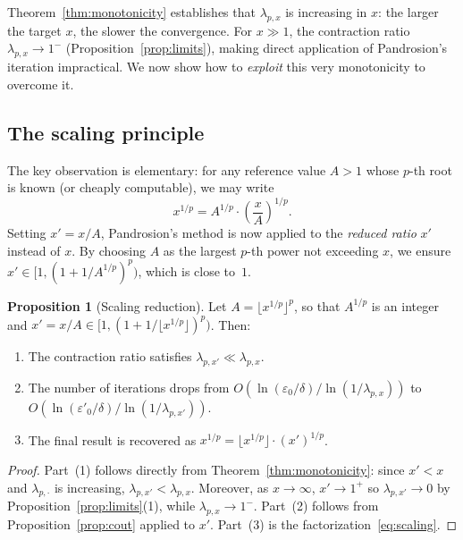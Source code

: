 \documentclass[11pt,a4paper]{article}
\theoremstyle{definition}
\newtheorem{proposition}{Proposition}[section]
\newcommand{\eps}{\varepsilon}
\begin{document}
Theorem~\ref{thm:monotonicity} establishes that $\lambda_{p,x}$ is increasing in $x$: the larger the target $x$, the slower the convergence. For $x \gg 1$, the contraction ratio $\lambda_{p,x} \to 1^-$ (Proposition~\ref{prop:limits}), making direct application of Pandrosion's iteration impractical. We now show how to \emph{exploit} this very monotonicity to overcome it.

\subsection{The scaling principle}

The key observation is elementary: for any reference value $A > 1$ whose $p$-th root is known (or cheaply computable), we may write
\begin{equation}
  \label{eq:scaling}
  x^{1/p} = A^{1/p} \cdot \left(\frac{x}{A}\right)^{\!1/p}.
\end{equation}
Setting $x' = x/A$, Pandrosion's method is now applied to the \emph{reduced ratio} $x'$ instead of $x$. By choosing $A$ as the largest $p$-th power not exceeding $x$, we ensure $x' \in [1, (1+1/A^{1/p})^p)$, which is close to~$1$.

\begin{proposition}[Scaling reduction]
\label{prop:scaling}
Let $A = \lfloor x^{1/p} \rfloor^p$, so that $A^{1/p}$ is an integer and $x' = x/A \in [1, (1+1/\lfloor x^{1/p}\rfloor)^p)$. Then:
\begin{enumerate}
  \item The contraction ratio satisfies $\lambda_{p,x'} \ll \lambda_{p,x}$.
  \item The number of iterations drops from $O(\ln(\eps_0/\delta) / \ln(1/\lambda_{p,x}))$ to $O(\ln(\eps'_0/\delta) / \ln(1/\lambda_{p,x'}))$.
  \item The final result is recovered as $x^{1/p} = \lfloor x^{1/p} \rfloor \cdot (x')^{1/p}$.
\end{enumerate}
\end{proposition}

\begin{proof}
Part~(1) follows directly from Theorem~\ref{thm:monotonicity}: since $x' < x$ and $\lambda_{p,\cdot}$ is increasing, $\lambda_{p,x'} < \lambda_{p,x}$. Moreover, as $x \to \infty$, $x' \to 1^+$ so $\lambda_{p,x'} \to 0$ by Proposition~\ref{prop:limits}(1), while $\lambda_{p,x} \to 1^-$. Part~(2) follows from Proposition~\ref{prop:cout} applied to $x'$. Part~(3) is the factorization~\eqref{eq:scaling}.
\end{proof}
\end{document}

